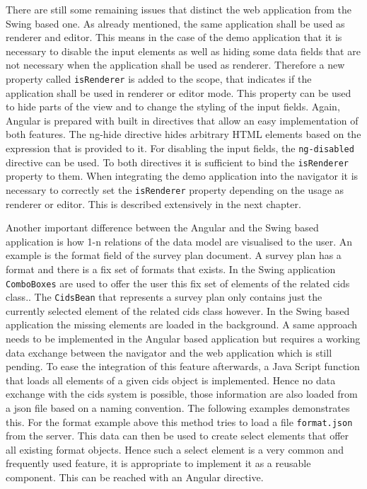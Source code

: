 There are still some remaining issues that distinct the web application from the Swing based one.
As already mentioned, the same application shall be used as renderer and editor.
This means in the case of the demo application that it is necessary to disable the input elements as well as hiding some data fields that are not necessary when the application shall be used as renderer.
Therefore a new property called \texttt{isRenderer} is added to the scope, that indicates if the application shall be used in renderer or editor mode.
This property can be used to hide parts of the view and to change the styling of the input fields.
Again, Angular is prepared with built in directives that allow an easy implementation of both features.
The ng-hide directive hides arbitrary HTML elements based on the expression that is provided to it.
For disabling the input fields, the \texttt{ng-disabled} directive can be used.
To both directives it is sufficient to bind the \texttt{isRenderer} property to them.
When integrating the demo application into the navigator it is necessary to correctly set the \texttt{isRenderer} property depending on the usage as renderer or editor.
This is described extensively in the next chapter.

Another important difference between the Angular and the Swing based application is how 1-n relations of the data model are visualised to the user.
An example is the format field of the survey plan document. A survey plan has a format and there is a fix set of formats that exists. 
In the Swing application \texttt{ComboBoxes} are used to offer the user this fix set of elements of the related cids class..
The \texttt{CidsBean} that represents a survey plan only contains just the currently selected element of the related cids class however.
In the Swing based application the missing elements are loaded in the background.
A same approach needs to be implemented in the Angular based application but requires a working data exchange between the navigator and the web application which is still pending.
To ease the integration of this feature afterwards, a Java Script function that loads all elements of a given cids object is implemented.
Hence no data exchange with the cids system is possible, those information are also loaded from a json file based on a naming convention.
The following examples demonstrates this.
For the format example above this method tries to load a file \texttt{format.json} from the server.
This data can then be used to create select elements that offer all existing format objects.
Hence such a select element is a very common and frequently used feature, it is appropriate to implement it as a reusable component.
This can be reached with an Angular directive.

